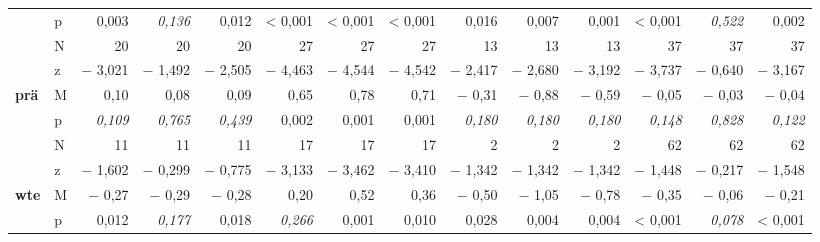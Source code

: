 \begin{sidewaystable}
\begin{tabularx}{\textwidth}{llrrrrrrrrrrrr}
& p & \cellcolor{lsLightGreen}0,003 & \textit{0,136} & \cellcolor{lsLightGreen}0,012 & \cellcolor{lsLightGreen}< 0,001 & \cellcolor{lsLightGreen}< 0,001 & \cellcolor{lsLightGreen}< 0,001 & \cellcolor{lsLightGreen}0,016 & \cellcolor{lsLightGreen}0,007 & \cellcolor{lsLightGreen}0,001 & \cellcolor{lsLightGreen}< 0,001 & \textit{0,522} & \cellcolor{lsLightGreen}0,002\\
& N & \cellcolor{lsLightGreen}20 & 20 & \cellcolor{lsLightGreen}20 & \cellcolor{lsLightGreen}27 & \cellcolor{lsLightGreen}27 & \cellcolor{lsLightGreen}27 & \cellcolor{lsLightGreen}13 & \cellcolor{lsLightGreen}13 & \cellcolor{lsLightGreen}13 & \cellcolor{lsLightGreen}37 & 37 & \cellcolor{lsLightGreen}37\\
& z & \cellcolor{lsLightGreen}$-$ 3,021 & $-$ 1,492 & \cellcolor{lsLightGreen}$-$ 2,505 & \cellcolor{lsLightGreen}$-$ 4,463 & \cellcolor{lsLightGreen}$-$ 4,544 & \cellcolor{lsLightGreen}$-$ 4,542 & \cellcolor{lsLightGreen}$-$ 2,417 & \cellcolor{lsLightGreen}$-$ 2,680 & \cellcolor{lsLightGreen}$-$ 3,192 & \cellcolor{lsLightGreen}$-$ 3,737 &  $-$ 0,640 & \cellcolor{lsLightGreen}$-$ 3,167\\
\textbf{prä} & M & 0,10 & 0,08 & 0,09 & \cellcolor{lsLightGreen}0,65 & \cellcolor{lsLightGreen}0,78 & \cellcolor{lsLightGreen}0,71 & $-$ 0,31 & $-$ 0,88 & $-$ 0,59 &  $-$ 0,05 & $-$ 0,03 & $-$ 0,04\\
& p & \textit{0,109} & \textit{0,765} & \textit{0,439} & \cellcolor{lsLightGreen}0,002 & \cellcolor{lsLightGreen}0,001 & \cellcolor{lsLightGreen}0,001 & \textit{0,180} & \textit{0,180} & \textit{0,180} & \textit{0,148} & \textit{0,828} & \textit{0,122}\\
& N & 11 & 11 & 11 & \cellcolor{lsLightGreen}17 & \cellcolor{lsLightGreen}17 & \cellcolor{lsLightGreen}17 & 2 & 2 & 2 & 62 & 62 & 62\\
& z & $-$ 1,602 & $-$ 0,299 & $-$ 0,775 & \cellcolor{lsLightGreen}$-$ 3,133 &\cellcolor{lsLightGreen} $-$ 3,462 & \cellcolor{lsLightGreen}$-$ 3,410 & $-$ 1,342 & $-$ 1,342 & $-$ 1,342 & $-$ 1,448 & $-$ 0,217 & $-$ 1,548\\
\textbf{wte} & M & \cellcolor{lsLightGreen}$-$ 0,27 & $-$ 0,29 & \cellcolor{lsLightGreen}$-$ 0,28 & 0,20 & \cellcolor{lsLightGreen}0,52 & \cellcolor{lsLightGreen}0,36 & \cellcolor{lsLightGreen} $-$ 0,50 & \cellcolor{lsLightGreen}$-$ 1,05 & \cellcolor{lsLightGreen}$-$ 0,78 & \cellcolor{lsLightGreen}$-$ 0,35 & $-$ 0,06 & \cellcolor{lsLightGreen}$-$ 0,21\\
& p & \cellcolor{lsLightGreen}0,012 & \textit{0,177} & \cellcolor{lsLightGreen}0,018 & \textit{0,266} & \cellcolor{lsLightGreen}0,001 & \cellcolor{lsLightGreen}0,010 & \cellcolor{lsLightGreen}0,028 & \cellcolor{lsLightGreen}0,004 & \cellcolor{lsLightGreen}0,004 & \cellcolor{lsLightGreen}< 0,001 & \textit{0,078} & \cellcolor{lsLightGreen}< 0,001\\

\end{tabularx}
\end{sidewaystable}
